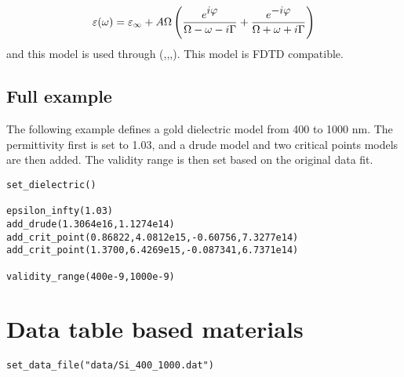 \begin{equation}
\varepsilon(\omega)=\varepsilon_\infty+A\Omega\left(\frac{\displaystyle e^{\displaystyle i\varphi}}{\displaystyle \Omega-\omega-i\Gamma}+\frac{\displaystyle e^{\displaystyle -i\varphi}}{\displaystyle \Omega+\omega+i\Gamma}\right)
\end{equation}
and this model is used through (,\lft{$\Omega$},\lft{$\varphi$},\lft{$\Gamma$}). This model is FDTD compatible.

\subsection{Full example}

The following example defines a gold dielectric model from 400 to 1000 nm. The permittivity first is set to 1.03, and a drude model and two critical points models are then added. The validity range is then set based on the original data fit.

\begin{lstlisting}
set_dielectric()

epsilon_infty(1.03)
add_drude(1.3064e16,1.1274e14)
add_crit_point(0.86822,4.0812e15,-0.60756,7.3277e14)
add_crit_point(1.3700,6.4269e15,-0.087341,6.7371e14)

validity_range(400e-9,1000e-9)
\end{lstlisting}

\section{Data table based materials}

%	
%	
\fwarn
\begin{lstlisting}
set_data_file("data/Si_400_1000.dat")
\end{lstlisting}